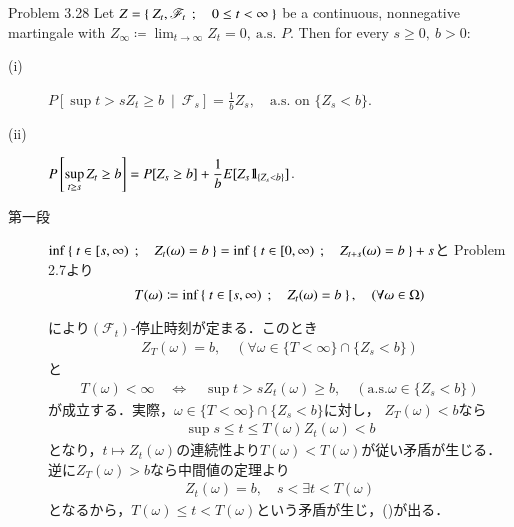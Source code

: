 	\begin{itembox}[l]{Problem 3.28}
		Let $Z = \left\{\ Z_t,\mathscr{F}_t\ \, ; \quad 0 \leq t < \infty\ \right\}$ be a continuous, nonnegative martingale with
		$Z_\infty \coloneqq \lim_{t \to \infty} Z_t = 0,\ \mbox{a.s. $P$}$. Then for every $s \geq 0,\ b > 0$:
		\begin{description}
			\item[(i)] $\displaystyle P\left[ \sup{t>s}{Z_t \geq b}\ \middle|\ \mathscr{F}_s \right] = \frac{1}{b} Z_s,
				\quad \mbox{a.s. on $\{Z_s < b\}$}$.
			\item[(ii)] $\displaystyle P\left[ \operatorname*{sup}_{t \geq s} Z_t \geq b \right] = P[Z_s \geq b] + \frac{1}{b} E[Z_s \mbox{1}\hspace{-0.25em}\mbox{l}_{\{Z_s < b\}}]$.
		\end{description}
	\end{itembox}
	
	\begin{prf}\mbox{}
		\begin{description}
			\item[第一段] $\operatorname*{inf}_{} \left\{\ t \in [s,\infty)\ \, ; \quad Z_t(\omega) = b\ \right\} = \operatorname*{inf}_{} \left\{\ t \in [0,\infty)\ \, ; \quad Z_{t+s}(\omega) = b\ \right\} + s$と
				Problem 2.7より
				\begin{align}
					T(\omega) \coloneqq \operatorname*{inf}_{} \left\{\ t \in [s,\infty)\ \, ; \quad Z_t(\omega) = b\ \right\},
					\quad (\forall \omega \in \Omega)
				\end{align}
				により$(\mathscr{F}_t)$-停止時刻が定まる．このとき
				\begin{align}
					Z_T(\omega) = b,
					\quad (\forall \omega \in \{T < \infty\} \cap \{Z_s < b\})
					\label{eq:chapter_1_Problem_3_28_1}
				\end{align}
				と
				\begin{align}
					T(\omega) < \infty
					\quad \Leftrightarrow \quad
					\sup{t > s}{Z_t(\omega)} \geq b,
					\quad (\mbox{a.s.}\omega \in \{Z_s < b\})
					\label{eq:chapter_1_Problem_3_28_2}
				\end{align}
				が成立する．実際，$\omega \in \{T < \infty\} \cap \{Z_s < b\}$に対し，
				$Z_T(\omega) < b$なら
				\begin{align}
					\sup{s \leq t \leq T(\omega)}{Z_t(\omega)} < b
				\end{align}
				となり，$t \longmapsto Z_t(\omega)$の連続性より$T(\omega) < T(\omega)$が従い矛盾が生じる．
				逆に$Z_T(\omega) > b$なら中間値の定理より
				\begin{align}
					Z_t(\omega) = b,
					\quad s < \exists t < T(\omega)
				\end{align}
				となるから，$T(\omega) \leq t < T(\omega)$という矛盾が生じ，()が出る．

\end{description}
\end{prf}
